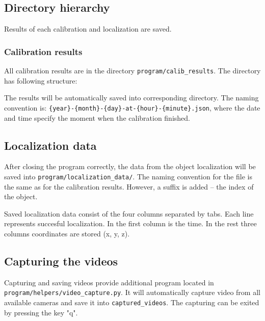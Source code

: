 \subsection{Directory hierarchy}
Results of each calibration and localization are saved.

\subsubsection{Calibration results}
All calibration results are in the directory \verb+program/calib_results+. The
directory has following structure:

\begin{figure}
 \end{figure}

The results will be automatically saved into corresponding directory. The
naming convention is: \verb+{year}-{month}-{day}-at-{hour}-{minute}.json+,
where the date and time specify the moment when the calibration finished.

\subsection{Localization data}
After closing the program correctly, the data from the object localization will
be saved into \verb+program/localization_data/+. The naming convention for the
file is the same as for the calibration results. However, a suffix is added --
the index of the object.

Saved localization data consist of the four columns separated by tabs. Each
line represents succesful localization. In the first column is the time. In the
rest three columns coordinates are stored (x, y, z).

\subsection{Capturing the videos} 

Capturing and saving videos provide additional program located in
\verb+program/helpers/video_capture.py+. It will automatically capture video
from all available cameras and save it into \verb+captured_videos+. The
capturing can be exited by pressing the key "q".
